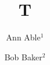 \documentclass{beamer}
\title{T}
\author{Ann Able$^{1}$ \and Bob Baker$^{2}$}
\institute{$^{1}$Univ A, Town A \and $^{2}$Univ B, Town B}
\begin{document}
\frame{\titlepage}
\end{document}
